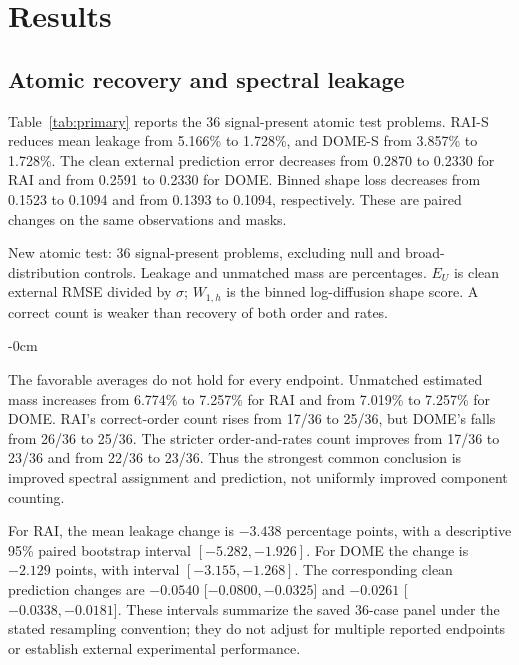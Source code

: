 \section{Results}\label{sec:results}
\subsection{Atomic recovery and spectral leakage}
Table~\ref{tab:primary} reports the 36 signal-present atomic test problems. RAI-S reduces mean leakage from 5.166\% to 1.728\%, and DOME-S from 3.857\% to 1.728\%. The clean external prediction error decreases from 0.2870 to 0.2330 for RAI and from 0.2591 to 0.2330 for DOME. Binned shape loss decreases from 0.1523 to 0.1094 and from 0.1393 to 0.1094, respectively. These are paired changes on the same observations and masks.

\begin{table}[htbp]
\caption{New atomic test: 36 signal-present problems, excluding null and broad-distribution controls. Leakage and unmatched mass are percentages. $E_U$ is clean external RMSE divided by $\sigma$; $W_{1,h}$ is the binned log-diffusion shape score. A correct count is weaker than recovery of both order and rates.}\label{tab:primary}
\begin{adjustwidth}{-\extralength}{0cm}\centering\small

\end{adjustwidth}
\end{table}

The favorable averages do not hold for every endpoint. Unmatched estimated mass increases from 6.774\% to 7.257\% for RAI and from 7.019\% to 7.257\% for DOME. RAI's correct-order count rises from 17/36 to 25/36, but DOME's falls from 26/36 to 25/36. The stricter order-and-rates count improves from 17/36 to 23/36 and from 22/36 to 23/36. Thus the strongest common conclusion is improved spectral assignment and prediction, not uniformly improved component counting.

For RAI, the mean leakage change is $-3.438$ percentage points, with a descriptive 95\% paired bootstrap interval $[-5.282,-1.926]$. For DOME the change is $-2.129$ points, with interval $[-3.155,-1.268]$. The corresponding clean prediction changes are $-0.0540$ [$-0.0800,-0.0325$] and $-0.0261$ [$-0.0338,-0.0181$]. These intervals summarize the saved 36-case panel under the stated resampling convention; they do not adjust for multiple reported endpoints or establish external experimental performance.

